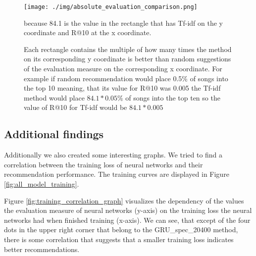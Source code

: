 \begin{figure}[h]
    \centering
	\texttt{[image: ./img/absolute\_evaluation\_comparison.png]}
	\caption[Method comparison to random suggestions heat map]{Each rectangle contains the multiple of how many times the method on its corresponding y coordinate is better than random suggestions of the evaluation measure on the corresponding x coordinate. For example if random recommendation would place 0.5\% of songs into the top 10 meaning, that its value for R@10 was 0.005 the Tf-idf method would place $84.1*0.05\%$ of songs into the top ten so the value of R@10 for Tf-idf would be $84.1*0.005$} because 84.1 is the value in the rectangle that has Tf-idf on the y coordinate and R@10 at the x coordinate.
	\label{fig:absolute_evaluation_comparison}
\end{figure}

\subsection{Additional findings}\label{ssec:additional findings}
Additionally we also created some interesting graphs. We tried to find a correlation between the training loss of neural networks and their recommendation performance. The training curves are displayed in Figure \ref{fig:all_model_training}. 

Figure \ref{fig:training_correlation_graph} visualizes the dependency of the values the evaluation measure of neural networks (y-axis) on the training loss the neural networks had when finished training (x-axis). We can see, that except of the four dots in the upper right corner that belong to the GRU\_spec\_20400 method, there is some correlation that suggests that a smaller training loss indicates better recommendations.

